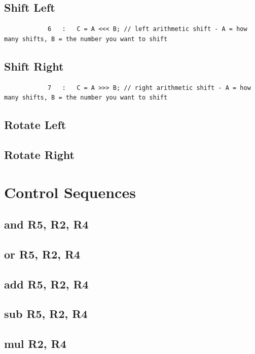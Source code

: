 \documentclass{article}
\begin{document}
    \subsection{Shift Left}
        \begin{lstlisting}
            6   :   C = A <<< B; // left arithmetic shift - A = how many shifts, B = the number you want to shift 
        \end{lstlisting}
    \subsection{Shift Right}
        \begin{lstlisting}
            7   :   C = A >>> B; // right arithmetic shift - A = how many shifts, B = the number you want to shift 
        \end{lstlisting}
    \subsection{Rotate Left}
        
    \subsection{Rotate Right}
        
\section{Control Sequences}
    \subsection{and R5, R2, R4} \label{AND}
        
    \subsection{or R5, R2, R4} \label{OR}
        
    \subsection{add R5, R2, R4} \label{ADD}
        
    \subsection{sub R5, R2, R4} \label{SUB}
        
    \subsection{mul R2, R4} \label{MUL}
        
\end{document}
